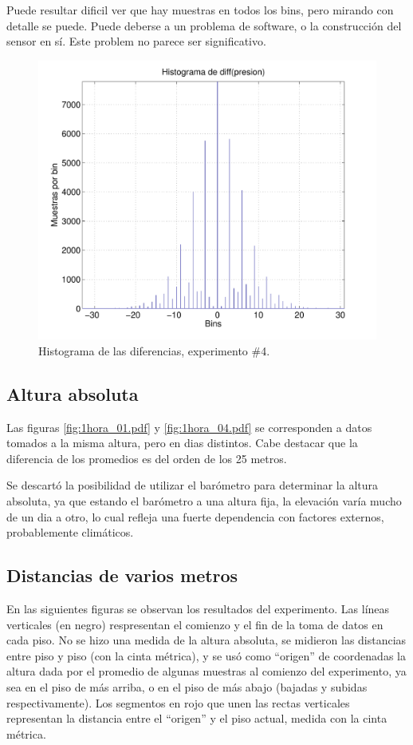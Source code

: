 \documentclass[spanish,12pt,a4paper,titlepage]{report}
\begin{document}
Puede resultar dificil ver que hay muestras en todos los bins, pero mirando con detalle se puede. Puede deberse a un problema de software, o la construcción del sensor en sí. Este problem no parece ser significativo.
\vspace{-14pt}
\begin{figure}[h!]
\centering
  \includegraphics[width=.75\textwidth]{./pics/barom_hist_exp4.pdf}
\vspace{-15pt}
  \caption{Histograma de las diferencias, experimento \#4.}
  \label{fig:barom_hist_exp4.pdf}
\end{figure}
\vspace{-40pt}


\newpage
\subsection{Altura absoluta}

Las figuras \ref{fig:1hora_01.pdf} y \ref{fig:1hora_04.pdf} se corresponden a datos tomados a la misma altura, pero en dias distintos. Cabe destacar que la diferencia de los promedios es del orden de los 25 metros.

Se descartó la posibilidad de utilizar el barómetro para determinar la altura absoluta, ya que estando el barómetro a una altura fija, la elevación varía mucho de un dia a otro, lo cual refleja una fuerte dependencia con factores externos, probablemente climáticos.

\subsection{Distancias de varios metros}

En las siguientes figuras se observan los resultados del experimento. Las líneas verticales (en negro) respresentan el comienzo y el fin de la toma de datos en cada piso. No se hizo una medida de la altura absoluta, se midieron las distancias entre piso y piso (con la cinta métrica), y se usó como ``origen'' de coordenadas la altura dada por el promedio de algunas muestras al comienzo del experimento, ya sea en el piso de más arriba, o en el piso de más abajo (bajadas y subidas respectivamente). Los segmentos en rojo que unen las rectas verticales representan la distancia entre el ``origen'' y el piso actual, medida con la cinta métrica.
\end{document}
